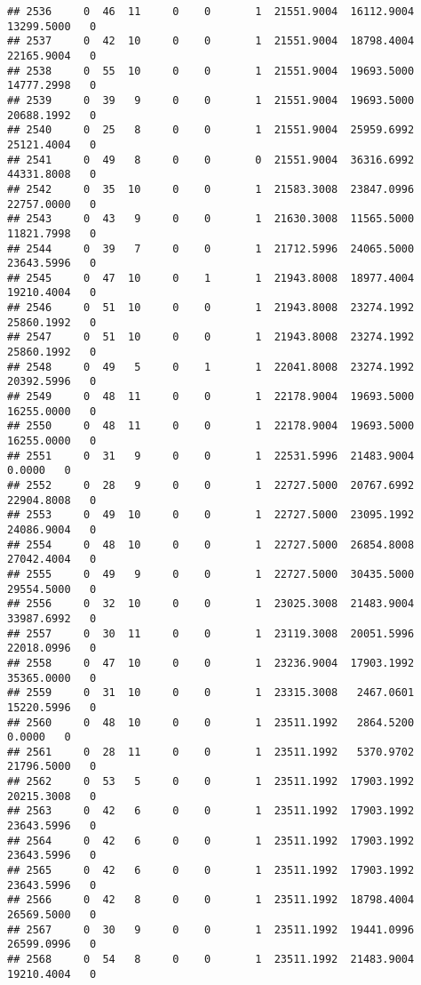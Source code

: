 \documentclass[
]{article}
\begin{document}
\begin{enumerate}
\begin{verbatim}
## 2536     0  46  11     0    0       1  21551.9004  16112.9004  13299.5000   0
## 2537     0  42  10     0    0       1  21551.9004  18798.4004  22165.9004   0
## 2538     0  55  10     0    0       1  21551.9004  19693.5000  14777.2998   0
## 2539     0  39   9     0    0       1  21551.9004  19693.5000  20688.1992   0
## 2540     0  25   8     0    0       1  21551.9004  25959.6992  25121.4004   0
## 2541     0  49   8     0    0       0  21551.9004  36316.6992  44331.8008   0
## 2542     0  35  10     0    0       1  21583.3008  23847.0996  22757.0000   0
## 2543     0  43   9     0    0       1  21630.3008  11565.5000  11821.7998   0
## 2544     0  39   7     0    0       1  21712.5996  24065.5000  23643.5996   0
## 2545     0  47  10     0    1       1  21943.8008  18977.4004  19210.4004   0
## 2546     0  51  10     0    0       1  21943.8008  23274.1992  25860.1992   0
## 2547     0  51  10     0    0       1  21943.8008  23274.1992  25860.1992   0
## 2548     0  49   5     0    1       1  22041.8008  23274.1992  20392.5996   0
## 2549     0  48  11     0    0       1  22178.9004  19693.5000  16255.0000   0
## 2550     0  48  11     0    0       1  22178.9004  19693.5000  16255.0000   0
## 2551     0  31   9     0    0       1  22531.5996  21483.9004      0.0000   0
## 2552     0  28   9     0    0       1  22727.5000  20767.6992  22904.8008   0
## 2553     0  49  10     0    0       1  22727.5000  23095.1992  24086.9004   0
## 2554     0  48  10     0    0       1  22727.5000  26854.8008  27042.4004   0
## 2555     0  49   9     0    0       1  22727.5000  30435.5000  29554.5000   0
## 2556     0  32  10     0    0       1  23025.3008  21483.9004  33987.6992   0
## 2557     0  30  11     0    0       1  23119.3008  20051.5996  22018.0996   0
## 2558     0  47  10     0    0       1  23236.9004  17903.1992  35365.0000   0
## 2559     0  31  10     0    0       1  23315.3008   2467.0601  15220.5996   0
## 2560     0  48  10     0    0       1  23511.1992   2864.5200      0.0000   0
## 2561     0  28  11     0    0       1  23511.1992   5370.9702  21796.5000   0
## 2562     0  53   5     0    0       1  23511.1992  17903.1992  20215.3008   0
## 2563     0  42   6     0    0       1  23511.1992  17903.1992  23643.5996   0
## 2564     0  42   6     0    0       1  23511.1992  17903.1992  23643.5996   0
## 2565     0  42   6     0    0       1  23511.1992  17903.1992  23643.5996   0
## 2566     0  42   8     0    0       1  23511.1992  18798.4004  26569.5000   0
## 2567     0  30   9     0    0       1  23511.1992  19441.0996  26599.0996   0
## 2568     0  54   8     0    0       1  23511.1992  21483.9004  19210.4004   0

\end{verbatim}
\end{enumerate}
\end{document}
